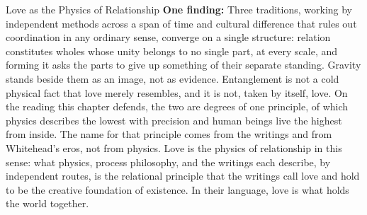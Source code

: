 \begin{convergencemoment}{Love as the Physics of Relationship}
\textbf{One finding:} Three traditions, working by independent methods across a span of time and cultural difference that rules out coordination in any ordinary sense, converge on a single structure: relation constitutes wholes whose unity belongs to no single part, at every scale, and forming it asks the parts to give up something of their separate standing. Gravity stands beside them as an image, not as evidence. Entanglement is not a cold physical fact that love merely resembles, and it is not, taken by itself, love. On the reading this chapter defends, the two are degrees of one principle, of which physics describes the lowest with precision and human beings live the highest from inside. The name for that principle comes from the \bahai writings and from Whitehead's eros, not from physics. Love is the physics of relationship in this sense: what physics, process philosophy, and the \bahai writings each describe, by independent routes, is the relational principle that the writings call love and hold to be the creative foundation of existence. In their language, love is what holds the world together.
\end{convergencemoment}

